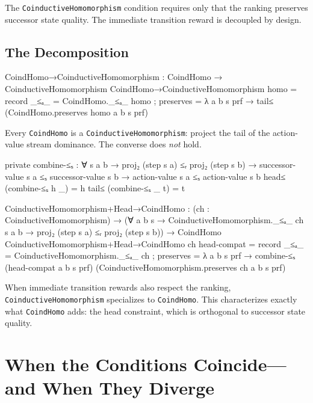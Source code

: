 \documentclass[runningheads]{llncs}
\begin{document}
\noindent The \texttt{CoinductiveHomomorphism} condition requires only that the ranking preserves successor state quality.  The immediate transition reward is decoupled by design.

\subsection{The Decomposition}

\begin{code}
  CoindHomo→CoinductiveHomomorphism : CoindHomo → CoinductiveHomomorphism
  CoindHomo→CoinductiveHomomorphism homo = record
    { _≤ₐ_ = CoindHomo._≤ₐ_ homo
    ; preserves = λ a b s prf → tail≤ (CoindHomo.preserves homo a b s prf)
    }
\end{code}

\noindent Every \texttt{CoindHomo} is a \texttt{CoinductiveHomomorphism}: project the tail of the action-value stream dominance.  The converse does \emph{not} hold.

\begin{code}[hide]
  private
    combine-≤ₛ : ∀ {s a b} →
      proj₂ (step s a) ≤ᵣ proj₂ (step s b) →
      successor-value s a ≤ₛ successor-value s b →
      action-value s a ≤ₛ action-value s b
    head≤ (combine-≤ₛ h _) = h
    tail≤ (combine-≤ₛ _ t) = t
\end{code}

\begin{code}
  CoinductiveHomomorphism+Head→CoindHomo :
    (ch : CoinductiveHomomorphism) →
    (∀ a b s → CoinductiveHomomorphism._≤ₐ_ ch s a b →
      proj₂ (step s a) ≤ᵣ proj₂ (step s b)) →
    CoindHomo
  CoinductiveHomomorphism+Head→CoindHomo ch head-compat = record
    { _≤ₐ_ = CoinductiveHomomorphism._≤ₐ_ ch
    ; preserves = λ a b s prf →
        combine-≤ₛ (head-compat a b s prf)
                   (CoinductiveHomomorphism.preserves ch a b s prf)
    }
\end{code}

\noindent When immediate transition rewards also respect the ranking, \texttt{CoinductiveHomomorphism} specializes to \texttt{CoindHomo}.  This characterizes exactly what \texttt{CoindHomo} adds: the head constraint, which is orthogonal to successor state quality.


\section{When the Conditions Coincide---and When They Diverge}\label{sec:landscape}
\end{document}
